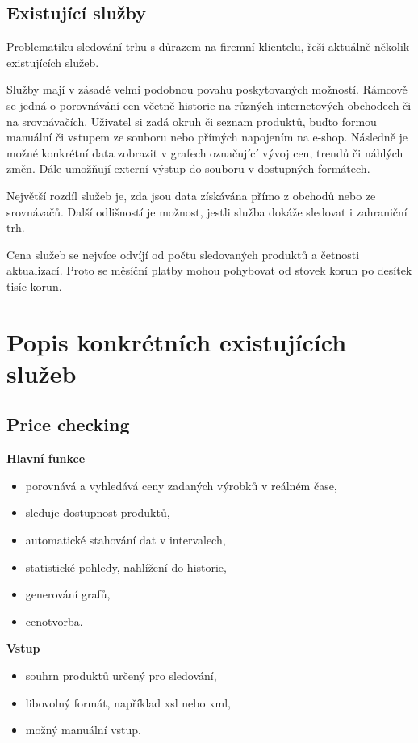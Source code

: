 \documentclass[thesis=B,czech]{FITthesis}[2012/06/26]
\begin{document}
\subsection{Existující služby}

Problematiku sledování trhu s důrazem na firemní klientelu, řeší aktuálně několik existujících služeb.
\par
Služby mají v zásadě velmi podobnou povahu poskytovaných možností. Rámcově se jedná o porovnávání cen včetně historie na různých internetových
obchodech či na srovnávačích. Uživatel si zadá okruh či seznam produktů, buďto formou manuální či vstupem ze souboru nebo 
přímých napojením na e-shop. Následně je možné konkrétní data zobrazit v grafech označující vývoj cen, trendů či náhlých změn.
Dále umožňují externí výstup do souboru v dostupných formátech.
\par
Největší rozdíl služeb je, zda jsou data získávána přímo z obchodů nebo ze srovnávačů. Další odlišností je 
možnost, jestli služba dokáže sledovat i zahraniční trh.
\par
Cena služeb se nejvíce odvíjí od počtu sledovaných produktů a četnosti aktualizací. Proto se měsíční platby mohou 
pohybovat od stovek korun po desítek tisíc korun.

\section{Popis konkrétních existujících služeb}

\subsection{Price checking\cite{priceChecking}} 


\textbf{Hlavní funkce}
\begin{itemize}
\item porovnává a vyhledává ceny zadaných výrobků v reálném čase,
\item sleduje dostupnost produktů,
\item automatické stahování dat v intervalech,
\item statistické pohledy, nahlížení do historie,
\item generování grafů,
\item cenotvorba.
\end{itemize}

\textbf{Vstup}
\begin{itemize}
\item souhrn produktů určený pro sledování,
\item libovolný formát, například xsl nebo xml,
\item možný manuální vstup.
\end{itemize}
\end{document}
